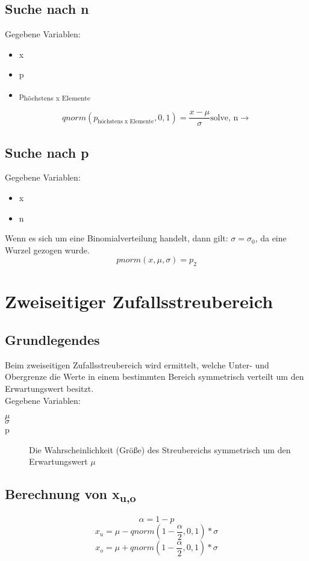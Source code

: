 \documentclass[a4paper,10pt]{article}
\begin{document}
\subsection{Suche nach n}
Gegebene Variablen:
\begin{itemize}
\item x
\item p
\item p\textsubscript{höchstens x Elemente}
\end{itemize}
\begin{equation}
  qnorm(p_{\text{höchstens x Elemente}}, 0, 1) = \frac{x -\mu}{\sigma} \text{solve, n} \rightarrow
\end{equation}

\subsection{Suche nach p}
Gegebene Variablen:
\begin{itemize}
\item x
\item n
\end{itemize}
Wenn es sich um eine Binomialverteilung handelt, dann gilt: $ \sigma =
\sigma_0 $, da eine Wurzel gezogen wurde.
\begin{equation}
  pnorm(x, \mu, \sigma) = p_2
\end{equation}

\section{Zweiseitiger Zufallsstreubereich}
\subsection{Grundlegendes}
Beim zweiseitigen Zufallsstreubereich wird ermittelt, welche Unter-
und Obergrenze die Werte in einem bestimmten Bereich symmetrisch
verteilt um den Erwartungswert besitzt.
\\
Gegebene Variablen:
\begin{description}
\item[$ \mu $]
\item[$ \sigma $]
\item[p] Die Wahrscheinlichkeit (Größe) des Streubereichs symmetrisch
  um den Erwartungswert $ \mu $
\end{description}

\subsection{Berechnung von x\textsubscript{u,o}}
\begin{equation}
  \alpha = 1 - p
\end{equation}
\begin{equation}
  x_u = \mu - qnorm(1 - \frac{\alpha}{2}, 0, 1) * \sigma
\end{equation}
\begin{equation}
  x_o = \mu + qnorm(1 - \frac{\alpha}{2}, 0, 1) * \sigma
\end{equation}
\end{document}
